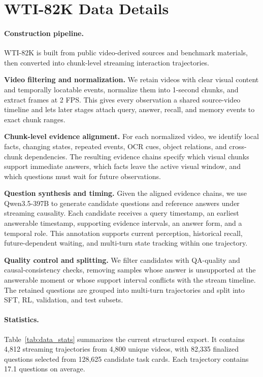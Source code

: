 \section{WTI-82K Data Details}
\label{app:data_stats}

\paragraph{Construction pipeline.}
WTI-82K is built from public video-derived sources and benchmark materials, then converted into chunk-level streaming interaction trajectories.

\noindent\textbf{Video filtering and normalization.}
We retain videos with clear visual content and temporally locatable events, normalize them into 1-second chunks, and extract frames at 2 FPS.
This gives every observation a shared source-video timeline and lets later stages attach query, answer, recall, and memory events to exact chunk ranges.

\noindent\textbf{Chunk-level evidence alignment.}
For each normalized video, we identify local facts, changing states, repeated events, OCR cues, object relations, and cross-chunk dependencies.
The resulting evidence chains specify which visual chunks support immediate answers, which facts leave the active visual window, and which questions must wait for future observations.

\noindent\textbf{Question synthesis and timing.}
Given the aligned evidence chains, we use Qwen3.5-397B to generate candidate questions and reference answers under streaming causality.
Each candidate receives a query timestamp, an earliest answerable timestamp, supporting evidence intervals, an answer form, and a temporal role.
This annotation supports current perception, historical recall, future-dependent waiting, and multi-turn state tracking within one trajectory.

\noindent\textbf{Quality control and splitting.}
We filter candidates with QA-quality and causal-consistency checks, removing samples whose answer is unsupported at the answerable moment or whose support interval conflicts with the stream timeline.
The retained questions are grouped into multi-turn trajectories and split into SFT, RL, validation, and test subsets.

\paragraph{Statistics.}
Table~\ref{tab:data_stats} summarizes the current structured export.
It contains 4,812 streaming trajectories from 4,800 unique videos, with 82,335 finalized questions selected from 128,625 candidate task cards.
Each trajectory contains 17.1 questions on average.

